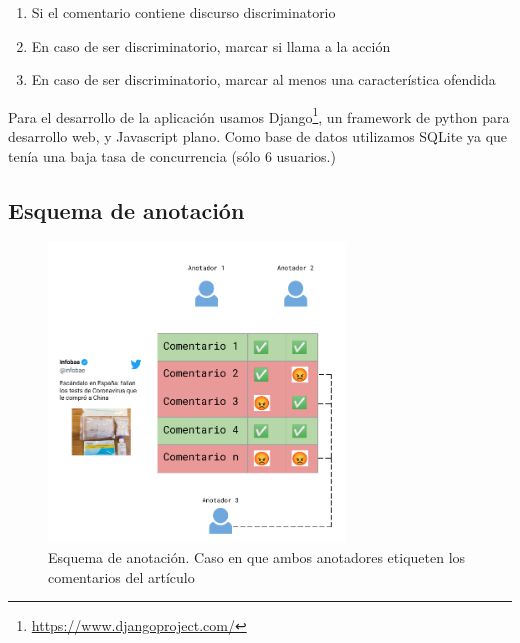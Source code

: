 \begin{enumerate}
    \item Si el comentario contiene discurso discriminatorio
    \item En caso de ser discriminatorio, marcar si llama a la acción
    \item En caso de ser discriminatorio, marcar al menos una característica ofendida
\end{enumerate}

Para el desarrollo de la aplicación usamos Django\footnote{\url{https://www.djangoproject.com/}}, un framework de python para desarrollo web, y Javascript plano. Como base de datos utilizamos SQLite ya que tenía una baja tasa de concurrencia (sólo 6 usuarios.)

\subsection{Esquema de anotación}



\begin{figure}
    \centering
    \includegraphics[width=0.7\textwidth]{img/esquema_anotacion.pdf}
    \caption{Esquema de anotación. Caso en que ambos anotadores etiqueten los comentarios del artículo}
    \label{fig:annotation_schema}
\end{figure}


